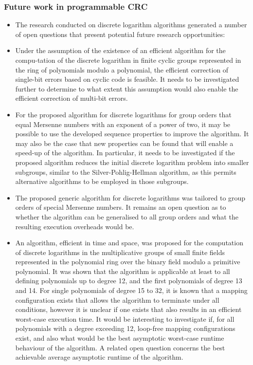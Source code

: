 \documentclass[oneside, a4paper, 11pt]{memoir}
\begin{document}
\subsubsection{Future work in programmable CRC}
\begin{itemize}
\item The research conducted on discrete logarithm algorithms generated a number of open questions that present potential future research opportunities:

\item Under the assumption of the existence of an efficient algorithm for the compu-tation of the discrete logarithm in finite cyclic groups represented in the ring of polynomials modulo a polynomial, the efficient correction of single-bit errors based on cyclic code is feasible. It needs to be investigated further to determine to what extent this assumption would also enable the efficient correction of multi-bit errors.

\item For the proposed algorithm for discrete logarithms for group orders that equal Mersenne numbers with an exponent of a power of two, it may be possible to use the developed sequence properties to improve the algorithm. It may also be the case that new properties can be found that will enable a speed-up of the algorithm. In particular, it needs to be investigated if the proposed algorithm reduces the initial discrete logarithm problem into smaller subgroups, similar to the Silver-Pohlig-Hellman algorithm, as this permits alternative algorithms to be employed in those subgroups.

\item The proposed generic algorithm for discrete logarithms was tailored to group orders of special Mersenne numbers. It remains an open question as to whether the algorithm can be generalised to all group orders and what the resulting execution overheads would be.

\item An algorithm, efficient in time and space, was proposed for the computation of discrete logarithms in the multiplicative groups of small finite fields represented in the polynomial ring over the binary field modulo a primitive polynomial. It was shown that the algorithm is applicable at least to all defining polynomials up to degree 12, and the first polynomials of degree 13 and 14. For single polynomials of degree 15 to 32, it is known that a mapping configuration exists that allows the algorithm to terminate under all conditions, however it is unclear if one exists that also results in an efficient worst-case execution time. It would be interesting to investigate if, for all polynomials with a degree exceeding 12, loop-free mapping configurations exist, and also what would be the best asymptotic worst-case runtime behaviour of the algorithm. A related open question concerns the best achievable average asymptotic runtime of the algorithm.


\end{itemize}
\end{document}
